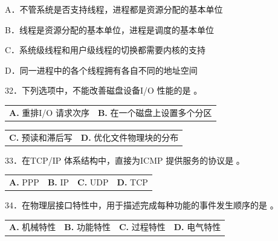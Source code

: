 \documentclass[UTF8,11pt]{ctexart}
\begin{document}
A．不管系统是否支持线程，进程都是资源分配的基本单位


B．线程是资源分配的基本单位，进程是调度的基本单位


C．系统级线程和用户级线程的切换都需要内核的支持


D．同一进程中的各个线程拥有各自不同的地址空间


32．下列选项中，不能改善磁盘设备I/O 性能的是 。


\begin{center}\begin{tabular}{>{\raggedright\arraybackslash}p{\dimexpr(\linewidth-4\tabcolsep)/2\relax}>{\raggedright\arraybackslash}p{\dimexpr(\linewidth-4\tabcolsep)/2\relax}}
\textbf{A.} 重排I/O 请求次序 & \textbf{B.} 在一个磁盘上设置多个分区\\[.35em]\end{tabular}\end{center}

\begin{center}\begin{tabular}{>{\raggedright\arraybackslash}p{\dimexpr(\linewidth-4\tabcolsep)/2\relax}>{\raggedright\arraybackslash}p{\dimexpr(\linewidth-4\tabcolsep)/2\relax}}
\textbf{C.} 预读和滞后写 & \textbf{D.} 优化文件物理块的分布\\[.35em]\end{tabular}\end{center}

33．在TCP/IP 体系结构中，直接为ICMP 提供服务的协议是 。


\begin{center}\begin{tabular}{>{\raggedright\arraybackslash}p{\dimexpr(\linewidth-8\tabcolsep)/4\relax}>{\raggedright\arraybackslash}p{\dimexpr(\linewidth-8\tabcolsep)/4\relax}>{\raggedright\arraybackslash}p{\dimexpr(\linewidth-8\tabcolsep)/4\relax}>{\raggedright\arraybackslash}p{\dimexpr(\linewidth-8\tabcolsep)/4\relax}}
\textbf{A.} PPP & \textbf{B.} IP & \textbf{C.} UDP & \textbf{D.} TCP\\[.35em]\end{tabular}\end{center}

34．在物理层接口特性中，用于描述完成每种功能的事件发生顺序的是 。


\begin{center}\begin{tabular}{>{\raggedright\arraybackslash}p{\dimexpr(\linewidth-8\tabcolsep)/4\relax}>{\raggedright\arraybackslash}p{\dimexpr(\linewidth-8\tabcolsep)/4\relax}>{\raggedright\arraybackslash}p{\dimexpr(\linewidth-8\tabcolsep)/4\relax}>{\raggedright\arraybackslash}p{\dimexpr(\linewidth-8\tabcolsep)/4\relax}}
\textbf{A.} 机械特性 & \textbf{B.} 功能特性 & \textbf{C.} 过程特性 & \textbf{D.} 电气特性\\[.35em]\end{tabular}\end{center}
\end{document}
